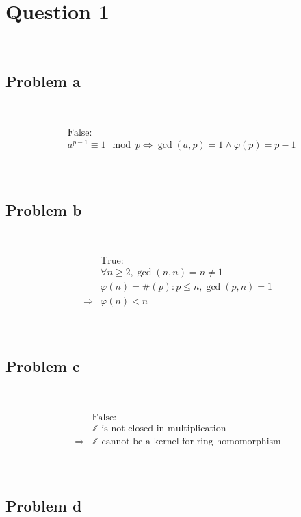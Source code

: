 \documentclass{article}
\begin{document}
\section*{Question 1}

~

\subsection*{Problem a }

~

\begin{align*}
    &\text{False}:\\
    &a^{p-1}\equiv 1\mod p\Leftrightarrow \gcd(a,p)=1\land \varphi(p)=p-1\\
\end{align*}

~

\subsection*{Problem b}

~

\begin{align*}
    &\text{True}:\\
    &\forall n\geqslant 2,\gcd(n,n)=n\ne 1\\
    &\varphi(n)=\#(p):p\leqslant n,\gcd(p,n)=1\\
    \Rightarrow&\varphi(n)<n\\
\end{align*}

~

\subsection*{Problem c}

~

\begin{align*}
    &\text{False}:\\
    &\mathbb{Z} \text{ is not closed in multiplication}\\
    \Rightarrow&\mathbb{Z} \text{ cannot be a kernel for ring homomorphism}\\
\end{align*}

~

\subsection*{Problem d}
\end{document}
